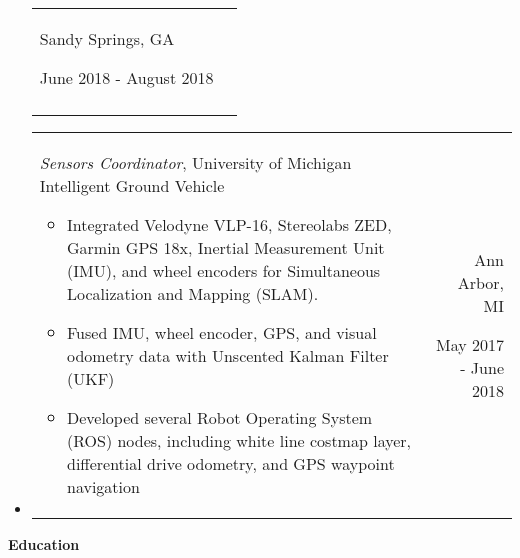 \documentclass[9pt]{memoir}
\begin{document}
\begin{itemize}
\begin{tabular}[t]{lr}
\begin{minipage}[t]{0.2 \textwidth}
\normalsize
Sandy Springs, GA

\small
June 2018 - August 2018
\end{minipage}

\\ \\

\end{tabular}

\item

\begin{tabular}[t]{lr}

\begin{minipage}[t]{0.7 \textwidth}
\raggedright

\normalsize
\textit{Sensors Coordinator}, University of Michigan Intelligent Ground Vehicle

\small

\begin{itemize}
\item Integrated Velodyne VLP-16, Stereolabs ZED, Garmin GPS 18x, Inertial
      Measurement Unit (IMU), and wheel encoders for Simultaneous Localization
      and Mapping (SLAM).
\item Fused IMU, wheel encoder, GPS, and visual odometry data with Unscented
      Kalman Filter (UKF)
\item Developed several Robot Operating System (ROS) nodes, including white line
      costmap layer, differential drive odometry, and GPS waypoint navigation
\end{itemize}

\end{minipage}

&

\begin{minipage}[t]{0.2 \textwidth}
\raggedleft

\normalsize
Ann Arbor, MI

\small
May 2017 - June 2018
\end{minipage}

\\

\end{tabular}
\end{itemize}

\begin{mdframed}
\textbf{Education}
\end{mdframed}
\end{document}
